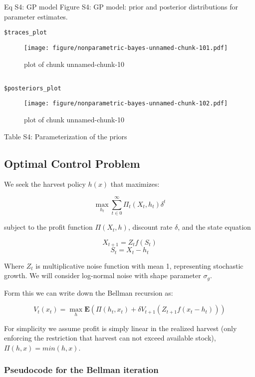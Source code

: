 \documentclass[author-year, review]{elsarticle} %
\makeatletter
\def\maxwidth{\ifdim\Gin@nat@width>\linewidth\linewidth
\else\Gin@nat@width\fi}
\let\Oldincludegraphics\includegraphics
\renewcommand{\includegraphics}[1]{\Oldincludegraphics[width=\maxwidth]{#1}}
\makeatother
\begin{document}
Eq S4: GP model Figure S4: GP model: prior and posterior distributions
for parameter estimates.

\begin{verbatim}
$traces_plot
\end{verbatim}

\begin{figure}[htbp]
\centering
\texttt{[image: figure/nonparametric-bayes-unnamed-chunk-101.pdf]}
\caption{plot of chunk unnamed-chunk-10}
\end{figure}

\begin{verbatim}

$posteriors_plot
\end{verbatim}

\begin{figure}[htbp]
\centering
\texttt{[image: figure/nonparametric-bayes-unnamed-chunk-102.pdf]}
\caption{plot of chunk unnamed-chunk-10}
\end{figure}

Table S4: Parameterization of the priors

\subsection{Optimal Control Problem}\label{optimal-control-problem}

We seek the harvest policy $h(x)$ that maximizes:

\[ \max_{h_t} \sum_{t \in 0}^{\infty}  \Pi_t(X_t, h_t) \delta^t  \]

subject to the profit function $\Pi(X_t,h)$, discount rate $\delta$, and
the state equation

\[X_{t+1} = Z_t f(S_t)  \] \[S_t = X_t - h_t \]

Where $Z_t$ is multiplicative noise function with mean 1, representing
stochastic growth. We will consider log-normal noise with shape
parameter $\sigma_g$.

Form this we can write down the Bellman recursion as:

\[V_t(x_t) = \max_h \mathbf{E} \left(\Pi(h_t, x_t) + \delta V_{t+1}( Z_{t+1} f(x_t - h_t)) \right)\]

For simplicity we assume profit is simply linear in the realized harvest
(only enforcing the restriction that harvest can not exceed available
stock), $\Pi(h,x) = min(h,x)$.

\subsubsection{Pseudocode for the Bellman
iteration}\label{pseudocode-for-the-bellman-iteration}
\end{document}
